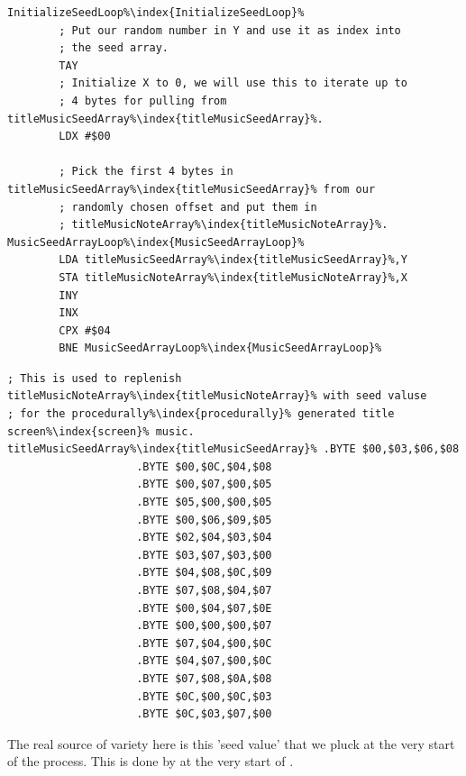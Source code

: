 \begin{lstlisting}[escapechar=\%,caption=Use our seed value to pull 4 bytes from \icode{titleMusicSeedArray\index{titleMusicSeedArray}} and
store them in \icode{titleMusicNoteArray\index{titleMusicNoteArray}}]
InitializeSeedLoop%\index{InitializeSeedLoop}%   
        ; Put our random number in Y and use it as index into
        ; the seed array.
        TAY
        ; Initialize X to 0, we will use this to iterate up to
        ; 4 bytes for pulling from titleMusicSeedArray%\index{titleMusicSeedArray}%.
        LDX #$00

        ; Pick the first 4 bytes in titleMusicSeedArray%\index{titleMusicSeedArray}% from our
        ; randomly chosen offset and put them in
        ; titleMusicNoteArray%\index{titleMusicNoteArray}%.
MusicSeedArrayLoop%\index{MusicSeedArrayLoop}%   
        LDA titleMusicSeedArray%\index{titleMusicSeedArray}%,Y
        STA titleMusicNoteArray%\index{titleMusicNoteArray}%,X
        INY
        INX
        CPX #$04
        BNE MusicSeedArrayLoop%\index{MusicSeedArrayLoop}%
\end{lstlisting}

\begin{lstlisting}[caption=Our seed bank for 4-byte sequences. It's 64 bytes long\, giving 16 possibles sequences in all.,escapechar=\%]
; This is used to replenish titleMusicNoteArray%\index{titleMusicNoteArray}% with seed valuse
; for the procedurally%\index{procedurally}% generated title screen%\index{screen}% music.
titleMusicSeedArray%\index{titleMusicSeedArray}% .BYTE $00,$03,$06,$08
                    .BYTE $00,$0C,$04,$08
                    .BYTE $00,$07,$00,$05
                    .BYTE $05,$00,$00,$05
                    .BYTE $00,$06,$09,$05
                    .BYTE $02,$04,$03,$04
                    .BYTE $03,$07,$03,$00
                    .BYTE $04,$08,$0C,$09
                    .BYTE $07,$08,$04,$07
                    .BYTE $00,$04,$07,$0E
                    .BYTE $00,$00,$00,$07
                    .BYTE $07,$04,$00,$0C
                    .BYTE $04,$07,$00,$0C
                    .BYTE $07,$08,$0A,$08
                    .BYTE $0C,$00,$0C,$03
                    .BYTE $0C,$03,$07,$00
\end{lstlisting}

The real source of variety here is this 'seed value' that we pluck at the very start of the process.
This is done by  at the very start of .

